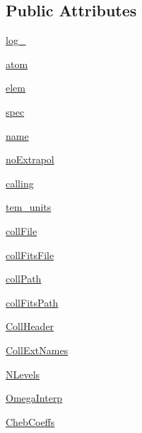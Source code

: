 \subsection*{Public Attributes}
\begin{DoxyCompactItemize}
\item 
\hyperlink{classpyneb_1_1core_1_1pynebcore_1_1___coll_data_fits_afd87151907f32bc0dc45f0171b61374e}{log\+\_\+}
\item 
\hyperlink{classpyneb_1_1core_1_1pynebcore_1_1___coll_data_fits_a0c5c7091b1d8a95d9bee2744d713f5c9}{atom}
\item 
\hyperlink{classpyneb_1_1core_1_1pynebcore_1_1___coll_data_fits_a62e73dc66c7aff7941c5ce94e808c23a}{elem}
\item 
\hyperlink{classpyneb_1_1core_1_1pynebcore_1_1___coll_data_fits_adaf1b66faf18504ec4b5c8c0b7f6763b}{spec}
\item 
\hyperlink{classpyneb_1_1core_1_1pynebcore_1_1___coll_data_fits_ab74e6bf80237ddc4109968cedc58c151}{name}
\item 
\hyperlink{classpyneb_1_1core_1_1pynebcore_1_1___coll_data_fits_a52e264b8c50ff2cf7d96c19e3f1e2a95}{no\+Extrapol}
\item 
\hyperlink{classpyneb_1_1core_1_1pynebcore_1_1___coll_data_fits_ab25fa7ebe84b603684dee62410c1e34c}{calling}
\item 
\hyperlink{classpyneb_1_1core_1_1pynebcore_1_1___coll_data_fits_a538e48ab1f2ca63dbe55abea69ca2242}{tem\+\_\+units}
\item 
\hyperlink{classpyneb_1_1core_1_1pynebcore_1_1___coll_data_fits_ab1799c18dddda68ec8651caf93c90e40}{coll\+File}
\item 
\hyperlink{classpyneb_1_1core_1_1pynebcore_1_1___coll_data_fits_a1570b17843b0152b836049295bedb8ec}{coll\+Fits\+File}
\item 
\hyperlink{classpyneb_1_1core_1_1pynebcore_1_1___coll_data_fits_adde256ff299a719e21c78ff9aad1b68c}{coll\+Path}
\item 
\hyperlink{classpyneb_1_1core_1_1pynebcore_1_1___coll_data_fits_aba92b77e6304fd2d31a920d7cd3a196d}{coll\+Fits\+Path}
\item 
\hyperlink{classpyneb_1_1core_1_1pynebcore_1_1___coll_data_fits_a38a28019b2004f62d5966a3883e08c3a}{Coll\+Header}
\item 
\hyperlink{classpyneb_1_1core_1_1pynebcore_1_1___coll_data_fits_a732b7a4bded0827cb1e366ef900d7e29}{Coll\+Ext\+Names}
\item 
\hyperlink{classpyneb_1_1core_1_1pynebcore_1_1___coll_data_fits_a4d45fe163c2108853ab418386bf4da56}{N\+Levels}
\item 
\hyperlink{classpyneb_1_1core_1_1pynebcore_1_1___coll_data_fits_a9fb4568356c398593832b0d4f2eb18d9}{Omega\+Interp}
\item 
\hyperlink{classpyneb_1_1core_1_1pynebcore_1_1___coll_data_fits_a17c4aa531ece492d2e5413133fb75d94}{Cheb\+Coeffs}
\end{DoxyCompactItemize}


